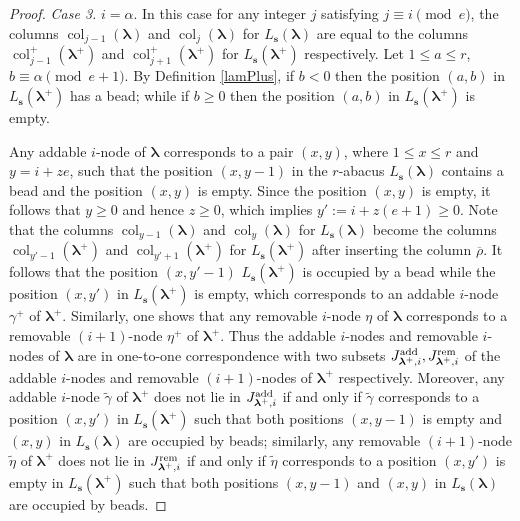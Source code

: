 \documentclass[a4paper,10pt]{amsart}
\theoremstyle{plain}
\def\bs{{\boldsymbol{s}}}
\def\blam{{\boldsymbol \lambda}}
\DeclareMathOperator{\col}{col}
\theoremstyle{plain}
\numberwithin{equation}{section}
\begin{document}
\begin{proof}
{\it Case 3.} $i=\alpha$. In this case for any integer $j$ satisfying $j\equiv i\pmod e$, the columns $\col_{j-1}(\blam)$ and $\col_j(\blam)$ for $L_\bs(\blam)$ are equal to the columns $\col^+_{j-1}(\blam^+)$ and $\col^+_{j+1}(\blam^+)$ for $L_\bs(\blam^+)$ respectively.
Let $1\le a\le r$, $b\equiv\alpha \pmod{e+1}$. By Definition \ref{lamPlus}, if $b<0$ then the position $(a, b)$ in $L_\bs(\blam^+)$ has a bead; while if $b\ge 0$ then the position $(a, b)$ in $L_\bs(\blam^+)$ is empty.



Any addable $i$-node of $\blam$ corresponds to a pair $(x,y)$, where $1 \le x \le r$ and $y=i+ze$, such that the position $(x, y-1)$ in the $r$-abacus $L_\bs(\blam)$ contains a bead and the position $(x, y)$ is empty.  Since the position $(x, y)$ is empty, it follows that $y \ge 0$ and hence $z\geq 0$, which implies $y':= i+z(e+1) \ge 0$. Note that the columns $\col_{y-1}(\blam)$ and $\col_{y}(\blam)$ for $L_\bs(\blam)$ become the columns
$\col_{y'-1}(\blam^+)$ and $\col_{y'+1}(\blam^+)$ for $L_\bs(\blam^+)$ after inserting the column $\overline{\rho}$. It follows that the position $(x, y'-1)$ $L_\bs(\blam^+)$ is occupied by a bead while the position $(x, y')$ in $L_\bs(\blam^+)$ is empty, which corresponds to an addable $i$-node $\gamma^+$ of $\blam^+$. Similarly, one shows that any removable $i$-node $\eta$ of $\blam$ corresponds to a removable $(i+1)$-node $\eta^+$ of $\blam^+$. Thus
the addable $i$-nodes and removable $i$-nodes of $\blam$ are in one-to-one correspondence with two subsets $J_{\blam^+,i}^{\rm{add}}, J_{\blam^+,i}^{\rm{rem}}$  of the addable $i$-nodes and removable $(i+1)$-nodes of $\blam^+$ respectively. Moreover, any addable $i$-node $\tilde{\gamma}$ of $\blam^+$ does not lie in $J_{\blam^+,i}^{\rm{add}}$ if and only if $\tilde{\gamma}$ corresponds to a position $(x,y')$ in $L_\bs(\blam^+)$ such that both positions $(x, y-1)$ is empty and $(x, y)$ in $L_\bs(\blam)$ are occupied by beads; similarly, any removable $(i+1)$-node $\tilde{\eta}$ of $\blam^+$ does not lie in $J_{\blam^+,i}^{\rm{rem}}$ if and only if $\tilde{\eta}$ corresponds to a position  $(x,y')$ is empty in $L_\bs(\blam^+)$ such that both positions $(x, y-1)$ and $(x, y)$ in $L_\bs(\blam)$ are occupied by beads.


\end{proof}
\end{document}
